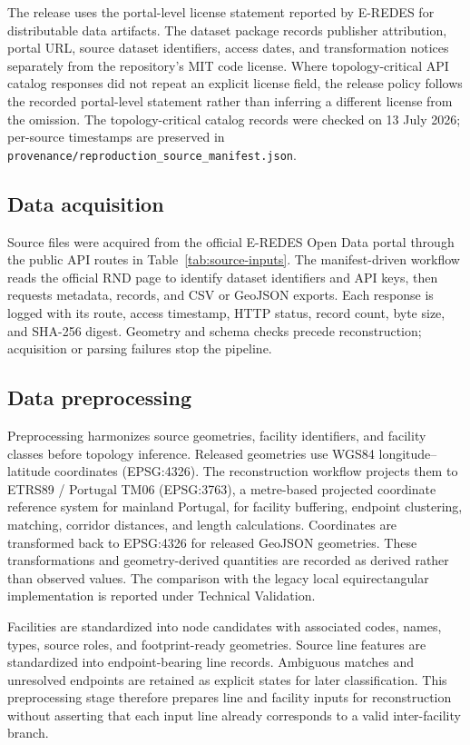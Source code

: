 \documentclass[10pt]{article}
\newcommand{\code}[1]{\texttt{#1}}
\begin{document}
The release uses the portal-level license statement reported by E-REDES for distributable data artifacts. The dataset package records publisher attribution, portal URL, source dataset identifiers, access dates, and transformation notices separately from the repository's MIT code license. Where topology-critical API catalog responses did not repeat an explicit license field, the release policy follows the recorded portal-level statement rather than inferring a different license from the omission. The topology-critical catalog records were checked on 13 July 2026; per-source timestamps are preserved in \code{provenance/reproduction\_source\_manifest.json}.

\subsection{Data acquisition}

Source files were acquired from the official E-REDES Open Data portal through the public API routes in Table~\ref{tab:source-inputs}. The manifest-driven workflow reads the official RND page to identify dataset identifiers and API keys, then requests metadata, records, and CSV or GeoJSON exports. Each response is logged with its route, access timestamp, HTTP status, record count, byte size, and SHA-256 digest. Geometry and schema checks precede reconstruction; acquisition or parsing failures stop the pipeline.

\subsection{Data preprocessing}

Preprocessing harmonizes source geometries, facility identifiers, and facility classes before topology inference. Released geometries use WGS84 longitude--latitude coordinates (EPSG:4326). The reconstruction workflow projects them to ETRS89 / Portugal TM06 (EPSG:3763), a metre-based projected coordinate reference system for mainland Portugal, for facility buffering, endpoint clustering, matching, corridor distances, and length calculations. Coordinates are transformed back to EPSG:4326 for released GeoJSON geometries. These transformations and geometry-derived quantities are recorded as derived rather than observed values. The comparison with the legacy local equirectangular implementation is reported under Technical Validation.

Facilities are standardized into node candidates with associated codes, names, types, source roles, and footprint-ready geometries. Source line features are standardized into endpoint-bearing line records. Ambiguous matches and unresolved endpoints are retained as explicit states for later classification. This preprocessing stage therefore prepares line and facility inputs for reconstruction without asserting that each input line already corresponds to a valid inter-facility branch.
\end{document}
